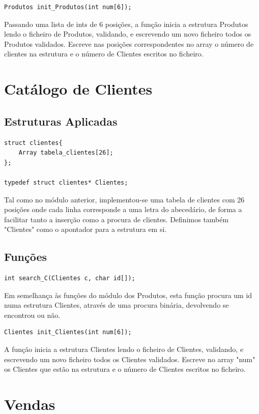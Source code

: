 \documentclass[a4paper]{report} %
\begin{document}
\begin{lstlisting}[style=CStyle]
Produtos init_Produtos(int num[6]);
\end{lstlisting}
Passando uma lista de ints de 6 posições, a função inicia a estrutura Produtos lendo o ficheiro de Produtos, validando, e escrevendo um novo ficheiro todos os Produtos validados. Escreve nas posições correspondentes no array o número de clientes na estrutura e o número de Clientes escritos no ficheiro.

\section{Catálogo de Clientes}

\subsection{Estruturas Aplicadas}
\begin{lstlisting}[style=CStyle]
struct clientes{
	Array tabela_clientes[26];
};

typedef struct clientes* Clientes;
\end{lstlisting}

Tal como no módulo anterior, implementou-se uma tabela de clientes com 26 posições onde cada linha corresponde a uma letra do abecedário, de forma a facilitar tanto a inserção como a procura de clientes. Definimos também "Clientes" como o apontador para a estrutura em si.
\par
\subsection{Funções}

\begin{lstlisting}[style=CStyle]
int search_C(Clientes c, char id[]);
\end{lstlisting}
Em semelhança às funções do módulo dos Produtos, esta função procura um id numa estrutura Clientes, através de uma procura binária, devolvendo se encontrou ou não.

\begin{lstlisting}[style=CStyle]
Clientes init_Clientes(int num[6]);
\end{lstlisting}
A função inicia a estrutura Clientes lendo o ficheiro de Clientes, validando, e escrevendo um novo ficheiro todos os Clientes validados. Escreve no array "num" os Clientes que estão na estrutura e o número de Clientes escritos no ficheiro. 

\section{Vendas}
\end{document}
